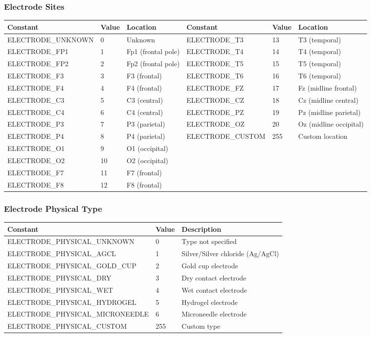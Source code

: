 \documentclass[11pt,a4paper]{article}
\begin{document}
\subsubsection{Electrode Sites}
\begin{longtable}{|>{\small}l|>{\small}l|>{\small}l||>{\small}l|>{\small}l|>{\small}l|}
\hline
\textbf{Constant} & \textbf{Value} & \textbf{Location} & \textbf{Constant} & \textbf{Value} & \textbf{Location} \\
\hline
ELECTRODE\_UNKNOWN & 0 & Unknown & ELECTRODE\_T3 & 13 & T3 (temporal) \\
ELECTRODE\_FP1 & 1 & Fp1 (frontal pole) & ELECTRODE\_T4 & 14 & T4 (temporal) \\
ELECTRODE\_FP2 & 2 & Fp2 (frontal pole) & ELECTRODE\_T5 & 15 & T5 (temporal) \\
ELECTRODE\_F3 & 3 & F3 (frontal) & ELECTRODE\_T6 & 16 & T6 (temporal) \\
ELECTRODE\_F4 & 4 & F4 (frontal) & ELECTRODE\_FZ & 17 & Fz (midline frontal) \\
ELECTRODE\_C3 & 5 & C3 (central) & ELECTRODE\_CZ & 18 & Cz (midline central) \\
ELECTRODE\_C4 & 6 & C4 (central) & ELECTRODE\_PZ & 19 & Pz (midline parietal) \\
ELECTRODE\_P3 & 7 & P3 (parietal) & ELECTRODE\_OZ & 20 & Oz (midline occipital) \\
ELECTRODE\_P4 & 8 & P4 (parietal) & ELECTRODE\_CUSTOM & 255 & Custom location \\
ELECTRODE\_O1 & 9 & O1 (occipital) &  &  &  \\
ELECTRODE\_O2 & 10 & O2 (occipital) &  &  &  \\
ELECTRODE\_F7 & 11 & F7 (frontal) &  &  &  \\
ELECTRODE\_F8 & 12 & F8 (frontal) &  &  &  \\
\hline
\end{longtable}

\subsubsection{Electrode Physical Type}
\begin{longtable}{|>{\small}l|>{\small}l|>{\small}p{7cm}|}
\hline
\textbf{Constant} & \textbf{Value} & \textbf{Description} \\
\hline
ELECTRODE\_PHYSICAL\_UNKNOWN & 0 & Type not specified \\
ELECTRODE\_PHYSICAL\_AGCL & 1 & Silver/Silver chloride (Ag/AgCl) \\
ELECTRODE\_PHYSICAL\_GOLD\_CUP & 2 & Gold cup electrode \\
ELECTRODE\_PHYSICAL\_DRY & 3 & Dry contact electrode \\
ELECTRODE\_PHYSICAL\_WET & 4 & Wet contact electrode \\
ELECTRODE\_PHYSICAL\_HYDROGEL & 5 & Hydrogel electrode \\
ELECTRODE\_PHYSICAL\_MICRONEEDLE & 6 & Microneedle electrode \\
ELECTRODE\_PHYSICAL\_CUSTOM & 255 & Custom type \\
\hline
\end{longtable}
\end{document}
